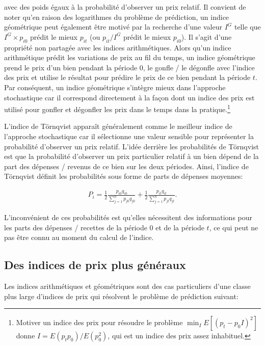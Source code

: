 \documentclass[]{article}
\begin{document}
avec des poids égaux à la probabilité d'observer un prix relatif. Il convient de noter qu'en raison des logarithmes du problème de prédiction, un indice géométrique peut également être motivé par la recherche d'une valeur \(I^{G}\) telle que \(I^{G} \times p_{i0}\) prédit le mieux \(p_{it}\) (ou \(p_{it} / I^{G}\) prédit le mieux \(p_{i0}\)). Il s'agit d'une propriété non partagée avec les indices arithmétiques. Alors qu'un indice arithmétique prédit les variations de prix au fil du temps, un indice géométrique prend le prix d'un bien pendant la période 0, le gonfle / le dégonfle avec l'indice des prix et utilise le résultat pour prédire le prix de ce bien pendant la période \(t\). Par conséquent, un indice géométrique s'intègre mieux dans l'approche stochastique car il correspond directement à la façon dont un indice des prix est utilisé pour gonfler et dégonfler les prix dans le temps dans la pratique.\footnote{Motiver un indice des prix pour résoudre le problème \(\min_{I} E[(p_{t} - p_{0} I)^{2}]\) donne \(I = E(p_{t} p_{0}) / E(p_{0}^{2})\), qui est un indice des prix assez inhabituel.}

L'indice de Törnqvist apparaît généralement comme le meilleur indice de l'approche stochastique car il sélectionne une valeur sensible pour représenter la probabilité d'observer un prix relatif. L'idée derrière les probabilités de Törnqvist est que la probabilité d'observer un prix particulier relatif à un bien dépend de la part des dépenses / revenus de ce bien sur les deux périodes. Ainsi, l'indice de Törnqvist définit les probabilités sous forme de parts de dépenses moyennes:

\begin{align*}
P_{i} = \frac{1}{2} \frac{p_{i0} q_{i0}}{\sum_{j = 1}^{n} p_{j0} q_{j0}} + \frac{1}{2} \frac{p_{it} q_{it}}{\sum_{j = 1}^{n} p_{jt} q_{jt}}.
\end{align*}

L'inconvénient de ces probabilités est qu'elles nécessitent des informations pour les parts des dépenses / recettes de la période 0 et de la période \(t\), ce qui peut ne pas être connu au moment du calcul de l'indice.

\hypertarget{des-indices-de-prix-plus-guxe9nuxe9raux}{%
\subsection{Des indices de prix plus généraux}\label{des-indices-de-prix-plus-guxe9nuxe9raux}}

Les indices arithmétiques et géométriques sont des cas particuliers d'une classe plus large d'indices de prix qui résolvent le problème de prédiction suivant:
\end{document}
